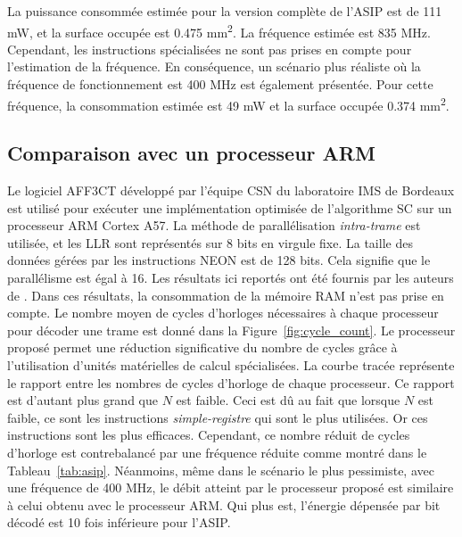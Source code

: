 La puissance consommée estimée pour la version complète de l'ASIP est de 111 mW, et la surface occupée est 0.475 mm\textsuperscript{2}. La fréquence estimée est 835 MHz. Cependant, les instructions spécialisées ne sont pas prises en compte pour l'estimation de la fréquence. En conséquence, un scénario plus réaliste où la fréquence de fonctionnement est 400 MHz est également présentée. Pour cette fréquence, la consommation estimée est 49 mW et la surface occupée 0.374 mm\textsuperscript{2}.

\subsection{Comparaison avec un processeur ARM}

Le logiciel AFF3CT développé par l'équipe CSN du laboratoire IMS de Bordeaux est utilisé pour exécuter une implémentation optimisée de l'algorithme SC sur un processeur ARM Cortex A57. La méthode de parallélisation \textit{intra-trame} est utilisée, et les LLR sont représentés sur 8 bits en virgule fixe. La taille des données gérées par les instructions NEON est de 128 bits. Cela signifie que le parallélisme est égal à 16. Les résultats ici reportés ont été fournis par les auteurs de \cite{cassagne_energy_2016}. Dans ces résultats, la consommation de la mémoire RAM n'est pas prise en compte.
Le nombre moyen de cycles d'horloges nécessaires à chaque processeur pour décoder une trame est donné dans la Figure~\ref{fig:cycle_count}. Le processeur proposé permet une réduction significative du nombre de cycles grâce à l'utilisation d'unités matérielles de calcul spécialisées. La courbe tracée représente le rapport entre les nombres de cycles d'horloge de chaque processeur. Ce rapport est d'autant plus grand que $N$ est faible. Ceci est dû au fait que lorsque $N$ est faible, ce sont les instructions \textit{simple-registre} qui sont le plus utilisées. Or ces instructions sont les plus efficaces.
Cependant, ce nombre réduit de cycles d'horloge est contrebalancé par une fréquence réduite comme montré dans le Tableau~\ref{tab:asip}. Néanmoins, même dans le scénario le plus pessimiste, avec une fréquence de 400 MHz, le débit atteint par le processeur proposé est similaire à celui obtenu avec le processeur ARM. Qui plus est, l'énergie dépensée par bit décodé est 10 fois inférieure pour l'ASIP.
